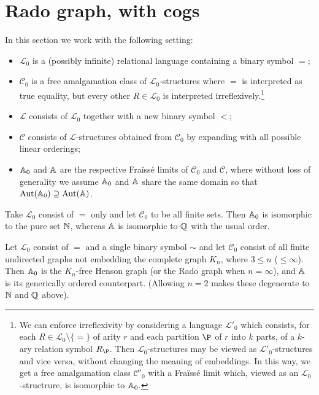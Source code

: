 \section{Rado graph, with cogs}
In this section we work with the following setting:
\begin{itemize}
    \item 
    $\mathcal{L}_0$ is a (possibly infinite) relational language containing a binary symbol $=$;

    \item 
    $\mathcal{C}_0$ is a free amalgamation class of $\mathcal{L}_0$-structures
    where $=$ is interpreted as true equality, but every other $R \in \mathcal{L}_0$ is interpreted irreflexively.\footnote{%
        We can enforce irreflexivity by considering a language $\mathcal{L}'_0$ which consists, 
        for each $R \in \mathcal{L}_0 \setminus \{=\}$ of arity $r$ and each partition $\P$ of $r$ into $k$ parts, 
        of a $k$-ary relation symbol $R_\P$.
        Then $\mathcal{L}_0$-structures may be viewed as $\mathcal{L}'_0$-structures and vice versa, without changing the meaning of embeddings.
        In this way, we get a free amalgamation class $\mathcal{C}'_0$ with a Fraïssé limit which, viewed as an $\mathcal{L}_0$-structrure, is isomorphic to $\mathbb{A}_0$.
    } 

    \item 
    $\mathcal{L}$ consists of $\mathcal{L}_0$ together with a new binary symbol $<$;

    \item 
    $\mathcal{C}$ consists of $\mathcal{L}$-structures obtained from $\mathcal{C}_0$ by expanding with all possible linear orderings;

    \item 
    $\mathbb{A}_0$ and $\mathbb{A}$ are the respective Fraïssé limits of $\mathcal{C}_0$ and $\mathcal{C}$,
    where without loss of generality we assume $\mathbb{A}_0$ and $\mathbb{A}$ share the same domain so that $\operatorname{Aut}(\mathbb{A}_0) \supseteq \operatorname{Aut}(\mathbb{A})$.
\end{itemize}

\begin{example}\label{ex:N-Q}
    Take $\mathcal{L}_0$ consist of $=$ only and let $\mathcal{C}_0$ to be all finite sets.
    Then $\mathbb{A}_0$ is isomorphic to the pure set $\mathbb{N}$, whereas $\mathbb{A}$ is isomorphic to $\mathbb{Q}$ with the usual order.
\end{example}

\begin{example}\label{ex:Rado-orderedRado}
    Let $\mathcal{L}_0$ consist of $=$ and a single binary symbol $\sim$ 
    and let $\mathcal{C}_0$ consist of all finite undirected graphs not embedding the complete graph $K_n$,
    where $3 \leq n$ ($\leq \infty$).
    Then $\mathbb{A}_0$ is the $K_n$-free Henson graph (or the Rado graph when $n = \infty$), and $\mathbb{A}$ is its generically ordered counterpart.
    (Allowing $n = 2$ makes these degenerate to $\mathbb{N}$ and $\mathbb{Q}$ above).
\end{example}

